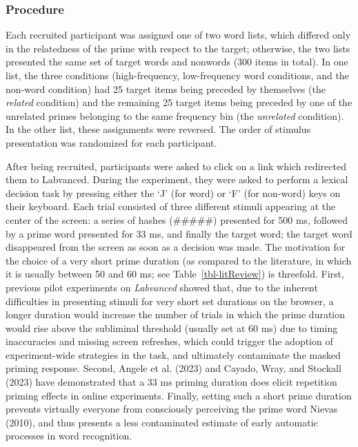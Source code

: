 \documentclass[
]{interact}
\begin{document}
\subsubsection{Procedure}\label{sec-exp1-methods-proc}

Each recruited participant was assigned one of two word lists, which
differed only in the relatedness of the prime with respect to the
target; otherwise, the two lists presented the same set of target words
and nonwords (300 items in total). In one list, the three conditions
(high-frequency, low-frequency word conditions, and the non-word
condition) had 25 target items being preceded by themselves (the
\emph{related} condition) and the remaining 25 target items being
preceded by one of the unrelated primes belonging to the same frequency
bin (the \emph{unrelated} condition). In the other list, these
assignments were reversed. The order of stimulus presentation was
randomized for each participant.

After being recruited, participants were asked to click on a link which
redirected them to Labvanced. During the experiment, they were asked to
perform a lexical decision task by pressing either the `J' (for word) or
`F' (for non-word) keys on their keyboard. Each trial consisted of three
different stimuli appearing at the center of the screen: a series of
hashes (\#\#\#\#\#) presented for 500 ms, followed by a prime word
presented for 33 ms, and finally the target word; the target word
disappeared from the screen as soon as a decision was made. The
motivation for the choice of a very short prime duration (as compared to
the literature, in which it is usually between 50 and 60 ms; see
Table~\ref{tbl-litReview}) is threefold. First, previous pilot
experiments on \emph{Labvanced} showed that, due to the inherent
difficulties in presenting stimuli for very short set durations on the
browser, a longer duration would increase the number of trials in which
the prime duration would rise above the subliminal threshold (usually
set at 60 ms) due to timing inaccuracies and missing screen refreshes,
which could trigger the adoption of experiment-wide strategies in the
task, and ultimately contaminate the masked priming response. Second,
Angele et al. (2023) and Cayado, Wray, and Stockall (2023) have
demonstrated that a 33 ms priming duration does elicit repetition
priming effects in online experiments. Finally, setting such a short
prime duration prevents virtually everyone from consciously perceiving
the prime word Nievas (2010), and thus presents a less contaminated
estimate of early automatic processes in word recognition.
\end{document}
